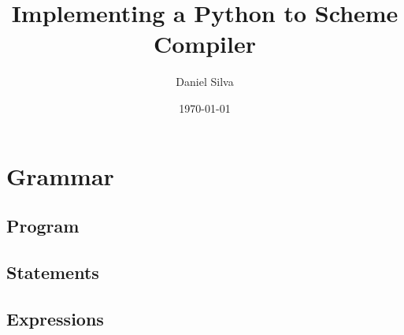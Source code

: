 \documentclass[12pt]{article}
\title{Implementing a Python to Scheme Compiler}
\author{Daniel Silva}
\date{\today}
\begin{document}
	\maketitle

	

	

	\let\rulesection\subsubsection
	\section{Grammar}
		\label{grammar}
		
		\subsection{Program}
			
		\subsection{Statements}
			
		\subsection{Expressions}
			

\end{document}
